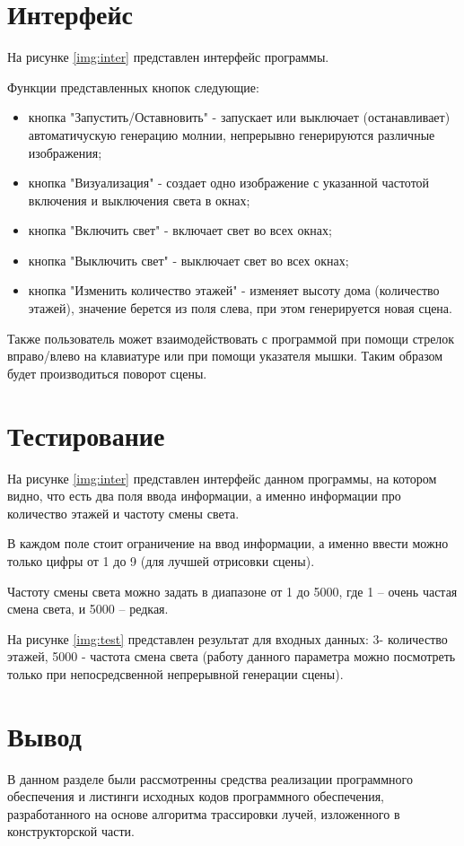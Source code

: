 \section{Интерфейс}
На рисунке \ref{img:inter} представлен интерфейс программы.


Функции представленных кнопок следующие:
\begin{itemize}
	\item кнопка "Запустить/Оставновить" - запускает или выключает (останавливает) автоматичускую генерацию молнии, непрерывно генерируются различные изображения;
	\item кнопка "Визуализация" - создает одно изображение с указанной частотой включения и выключения света в окнах;
	\item кнопка "Включить свет" - включает свет во всех окнах;
	\item кнопка "Выключить свет" - выключает свет во всех окнах;
	\item кнопка "Изменить количество этажей" - изменяет высоту дома (количество этажей), значение берется из поля слева, при этом генерируется новая сцена.
\end{itemize}

Также пользователь может взаимодействовать с программой при помощи стрелок вправо/влево на клавиатуре или при помощи указателя мышки. Таким образом будет производиться поворот сцены.

\section{Тестирование}

На рисунке \ref{img:inter} представлен интерфейс данном программы, на котором видно, что есть два поля ввода информации, а именно информации про количество этажей и частоту смены света. 

В каждом поле стоит ограничение на ввод информации, а именно ввести можно только цифры от 1 до 9 (для лучшей отрисовки сцены).

Частоту смены света можно задать в диапазоне от 1 до 5000, где 1 -- очень частая смена света, и 5000 -- редкая.

На рисунке \ref{img:test} представлен результат для входных данных: 3- количество этажей, 5000 - частота смена света (работу данного параметра можно посмотреть только при непосредсвенной непрерывной генерации сцены).



\section{Вывод}

В данном разделе были рассмотренны средства реализации программного обеспечения и листинги исходных кодов программного обеспечения, разработанного на основе алгоритма трассировки лучей, изложенного в конструкторской части.
